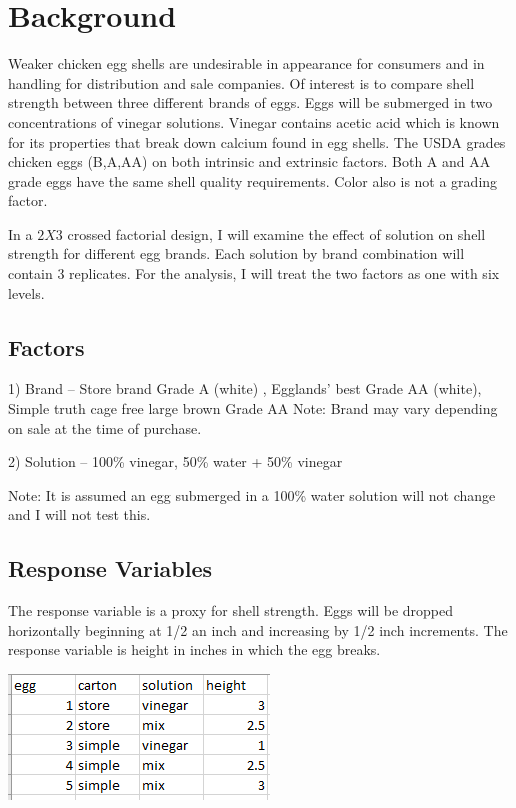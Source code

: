 \documentclass{article}\usepackage[]{graphicx}\usepackage[]{color}
\begin{document}
\section{Background}

Weaker chicken egg shells are undesirable in appearance for consumers and in handling for distribution and sale companies. Of interest is to compare shell strength between three different brands of eggs. Eggs will be submerged in two concentrations of vinegar solutions. Vinegar contains acetic acid which is known for its properties that break down calcium found in egg shells. The USDA grades chicken eggs (B,A,AA) on both intrinsic and extrinsic factors. Both A and AA grade eggs have the same shell quality requirements. Color also is not a grading factor.

In a $2X3$ crossed factorial design, I will examine the effect of solution on shell strength for different egg brands. Each solution by brand combination will contain 3 replicates. For the analysis, I will treat the two factors as one with six levels.

\subsection{Factors}

1) Brand -- Store brand Grade A (white) , Egglands' best Grade AA (white), Simple truth cage free large brown Grade AA
Note: Brand may vary depending on sale at the time of purchase.

2) Solution -- 100\% vinegar, 50\% water + 50\% vinegar

Note: It is assumed an egg submerged in a 100\% water solution will not change and I will not test this.

\subsection{Response Variables}

The response variable is a proxy for shell strength. Eggs will be dropped horizontally beginning at 1/2 an inch and increasing by 1/2 inch increments. The response variable is height in inches in which the egg breaks.


\begin{center}
\includegraphics{spreadex}
\end{center}
\end{document}
